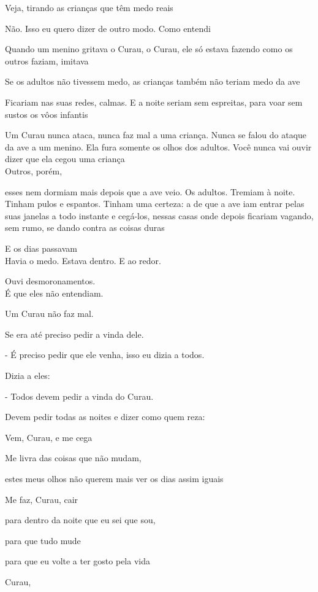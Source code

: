 Veja, tirando as crianças que têm medo reais

Não. Isso eu quero dizer de outro modo. Como entendi

Quando um menino gritava o Curau, o Curau, ele só estava fazendo como os
outros faziam, imitava

Se os adultos não tivessem medo, as crianças também não teriam medo da
ave

Ficariam nas suas redes, calmas. E a noite seriam sem espreitas, para
voar sem sustos os vôos infantis

Um Curau nunca ataca, nunca faz mal a uma criança. Nunca se falou do
ataque da ave a um menino. Ela fura somente os olhos dos adultos. Você
nunca vai ouvir dizer que ela cegou uma criança\\

Outros, porém,

esses nem dormiam mais depois que a ave veio. Os adultos. Tremiam à
noite. Tinham pulos e espantos. Tinham uma certeza: a de que a ave iam
entrar pelas suas janelas a todo instante e cegá-los, nessas casas onde
depois ficariam vagando, sem rumo, se dando contra as coisas duras

E os dias passavam\\

Havia o medo. Estava dentro. E ao redor.

Ouvi desmoronamentos.\\

É que eles não entendiam.

Um Curau não faz mal.

Se era até preciso pedir a vinda dele.

- É preciso pedir que ele venha, isso eu dizia a todos.

Dizia a eles:

- Todos devem pedir a vinda do Curau.

Devem pedir todas as noites e dizer como quem reza:

Vem, Curau, e me cega

Me livra das coisas que não mudam,

estes meus olhos não querem mais ver os dias assim iguais

Me faz, Curau, cair

para dentro da noite que eu sei que sou,

para que tudo mude

para que eu volte a ter gosto pela vida

Curau,


